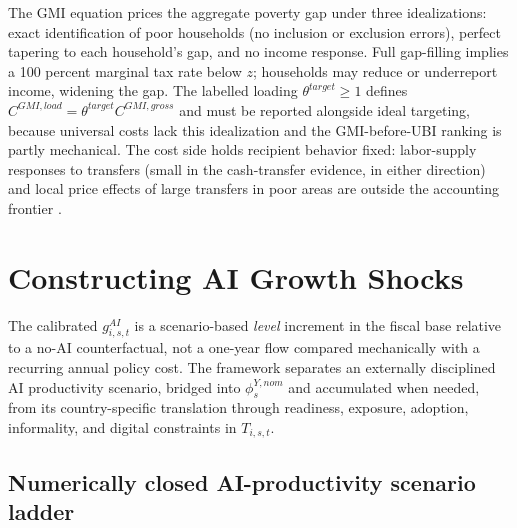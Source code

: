 \documentclass[11pt,a4paper]{article}
\begin{document}
The GMI equation prices the aggregate poverty gap under three idealizations: exact identification of poor households (no inclusion or exclusion errors), perfect tapering to each household's gap, and no income response. Full gap-filling implies a 100 percent marginal tax rate below $z$; households may reduce or underreport income, widening the gap. The labelled loading $\theta^{target}\geq1$ defines $C^{GMI,load}=\theta^{target}C^{GMI,gross}$ and must be reported alongside ideal targeting, because universal costs lack this idealization and the GMI-before-UBI ranking is partly mechanical.
The cost side holds recipient behavior fixed: labor-supply responses to transfers (small in the cash-transfer evidence, in either direction) and local price effects of large transfers in poor areas are outside the accounting frontier \citep{gentilini2020ubi,oecd2017basicincome}.

\section{Constructing AI Growth Shocks}\label{sec:ai_shocks}

The calibrated $g^{AI}_{i,s,t}$ is a scenario-based \emph{level} increment in the fiscal base relative to a no-AI counterfactual, not a one-year flow compared mechanically with a recurring annual policy cost. The framework separates an externally disciplined AI productivity scenario, bridged into $\phi^{Y,nom}_s$ and accumulated when needed, from its country-specific translation through readiness, exposure, adoption, informality, and digital constraints in $T_{i,s,t}$.

\subsection{Numerically closed AI-productivity scenario ladder}\label{subsec:phi_ladder_main}
\end{document}
